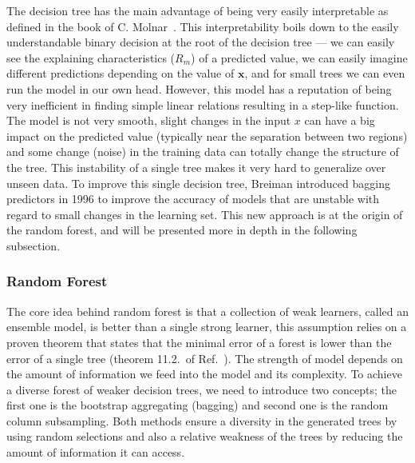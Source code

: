 \documentclass[main]{subfiles}
\begin{document}
The decision tree has the main advantage of being very easily interpretable as defined in the book of C. Molnar~\cite{molnar2020interpretable}. This interpretability boils down to the easily understandable binary decision at the root of the decision tree --- we can easily see the explaining characteristics ($R_m$) of a predicted value, we can easily imagine different predictions depending on the value of $\mathbf{x}$, and for small trees we can even run the model in our own head. However, this model has a reputation of being very inefficient in finding simple linear relations resulting in a step-like function. The model is not very smooth, slight changes in the input $x$ can have a big impact on the predicted value (typically near the separation between two regions) and some change (noise) in the training data can totally change the structure of the tree. This instability of a single tree makes it very hard to generalize over unseen data.\autocite{molnar2020interpretable} To improve this single decision tree, Breiman introduced bagging predictors in 1996 to improve the accuracy of models that are unstable with regard to small changes in the learning set.\autocite{Breiman_1996} This new approach is at the origin of the random forest, and will be presented more in depth in the following subsection.

\subsubsection{Random Forest}

The core idea behind random forest is that a collection of weak learners, called an ensemble model, is better than a single strong learner, this assumption relies on a proven theorem that states that the minimal error of a forest is lower than the error of a single tree (theorem 11.2.\ of Ref.~\cite{Breiman_2001}). The strength of model depends on the amount of information we feed into the model and its complexity. To achieve a diverse forest of weaker decision trees, we need to introduce two concepts; the first one is the bootstrap aggregating (bagging) and second one is the random column subsampling. Both methods ensure a diversity in the generated trees by using random selections and also a relative weakness of the trees by reducing the amount of information it can access. 
\end{document}
